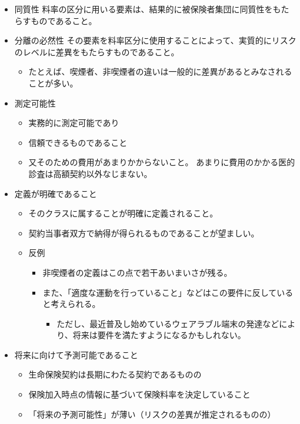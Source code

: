 \documentclass[]{article}
\begin{document}
\begin{itemize}
\tightlist
\item
  同質性
  料率の区分に用いる要素は、結果的に被保険者集団に同質性をもたらすものであること。
\item
  分離の必然性
  その要素を料率区分に使用することによって、実質的にリスクのレベルに差異をもたらすものであること。

  \begin{itemize}
  \tightlist
  \item
    たとえば、喫煙者、非喫煙者の違いは一般的に差異があるとみなされることが多い。
  \end{itemize}
\item
  測定可能性

  \begin{itemize}
  \tightlist
  \item
    実務的に測定可能であり
  \item
    信頼できるものであること
  \item
    又そのための費用があまりかからないこと。
    あまりに費用のかかる医的診査は高額契約以外なじまない。
  \end{itemize}
\item
  定義が明確であること

  \begin{itemize}
  \tightlist
  \item
    そのクラスに属することが明確に定義されること。
  \item
    契約当事者双方で納得が得られるものであることが望ましい。
  \item
    反例

    \begin{itemize}
    \tightlist
    \item
      非喫煙者の定義はこの点で若干あいまいさが残る。
    \item
      また、「適度な運動を行っていること」などはこの要件に反していると考えられる。

      \begin{itemize}
      \tightlist
      \item
        ただし、最近普及し始めているウェアラブル端末の発達などにより、将来は要件を満たすようになるかもしれない。
      \end{itemize}
    \end{itemize}
  \end{itemize}
\item
  将来に向けて予測可能であること

  \begin{itemize}
  \tightlist
  \item
    生命保険契約は長期にわたる契約であるものの
  \item
    保険加入時点の情報に基づいて保険料率を決定していること
  \item
    「将来の予測可能性」が薄い（リスクの差異が推定されるものの）


\end{itemize}
\end{itemize}
\end{document}
